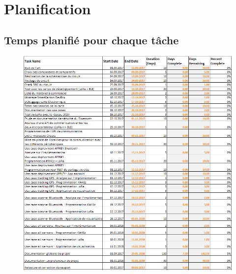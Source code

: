 
\appendixpagenumbering %

\chapter{Planification} %
\label{AppendixGanttPlanning} 

\section{Temps planifié pour chaque tâche}
\label{AppendixGanttPlanning_estimate} 

\begin{figure}[ht!]
    \centering
    \includegraphics[width=1.0\textwidth]{Figures/Appendixes/gantt_planning_estimate_details.png}
    \label{figapdx-gantt_planning_estimate_details}
\end{figure}

